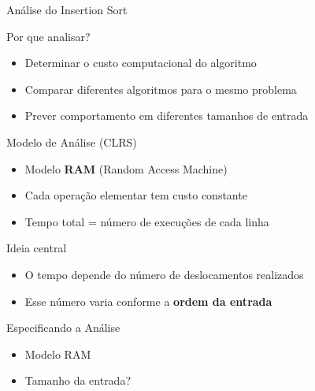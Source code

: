 \documentclass{beamer}
\begin{document}
\begin{frame}{Análise do Insertion Sort}

\begin{block}{Por que analisar?}
\begin{itemize}
    \item Determinar o custo computacional do algoritmo
    \item Comparar diferentes algoritmos para o mesmo problema
    \item Prever comportamento em diferentes tamanhos de entrada
\end{itemize}
\end{block}

\vspace{0.3cm}

\begin{block}{Modelo de Análise (CLRS)}
\begin{itemize}
    \item Modelo \textbf{RAM} (Random Access Machine)
    \item Cada operação elementar tem custo constante
    \item Tempo total = número de execuções de cada linha
\end{itemize}
\end{block}

\vspace{0.3cm}

\begin{alertblock}{Ideia central}
\begin{itemize}
    \item O tempo depende do número de deslocamentos realizados
    \item Esse número varia conforme a \textbf{ordem da entrada}
\end{itemize}
\end{alertblock}

\end{frame}
\begin{frame}{Especificando a Análise }
\begin{itemize}
    \item Modelo RAM 
    \item Tamanho da entrada?
\end{itemize}
\end{frame}
\end{document}
